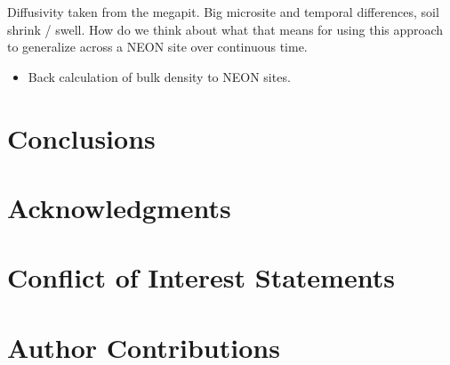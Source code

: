 \documentclass[
  letterpaper,
  DIV=11,
  numbers=noendperiod]{scrartcl}
\providecommand{\tightlist}{%
  \setlength{\itemsep}{0pt}\setlength{\parskip}{0pt}}\usepackage{longtable,booktabs,array}
\begin{document}
Diffusivity taken from the megapit. Big microsite and temporal
differences, soil shrink / swell. How do we think about what that means
for using this approach to generalize across a NEON site over continuous
time.

\begin{itemize}
\tightlist
\item
  Back calculation of bulk density to NEON sites.
\end{itemize}

\section{Conclusions}\label{conclusions}

\section{Acknowledgments}\label{acknowledgments}

\section{Conflict of Interest
Statements}\label{conflict-of-interest-statements}

\section*{Author Contributions}\label{author-contributions}
\end{document}
